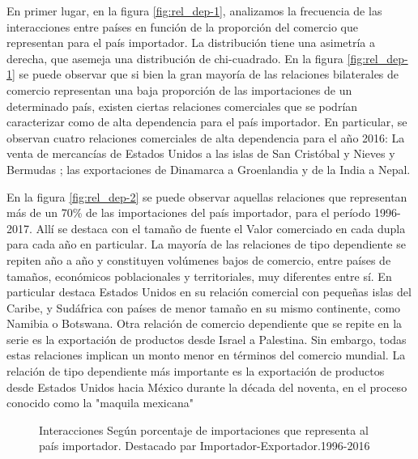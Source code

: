 \documentclass[class=article, crop=false]{standalone}
\begin{document}
En primer lugar, en la figura \ref{fig:rel_dep-1}, analizamos la frecuencia de las interacciones entre países en función de la proporción del comercio que representan para el país importador. La distribución tiene una asimetría a derecha, que asemeja una distribución de chi-cuadrado. En la figura \ref{fig:rel_dep-1} se puede observar que si bien la gran mayoría de las relaciones bilaterales de comercio representan una baja proporción de las importaciones de un determinado país, existen ciertas relaciones comerciales que se podrían caracterizar como de alta dependencia para el país importador. 
En particular, se observan cuatro relaciones comerciales de alta dependencia para el año 2016: La venta de mercancías de Estados Unidos a las islas de San Cristóbal y Nieves y Bermudas ; las exportaciones de Dinamarca a Groenlandia y de la India a Nepal. 

En la figura \ref{fig:rel_dep-2} se puede observar aquellas relaciones que representan más de un 70\% de las importaciones del país importador, para el período 1996-2017. Allí se destaca con el tamaño de fuente el Valor comerciado en cada dupla para cada año en particular. La mayoría de las relaciones de tipo dependiente se repiten año a año y constituyen volúmenes bajos de comercio, entre países de tamaños, económicos poblacionales y territoriales, muy diferentes entre sí. En particular destaca Estados Unidos en su relación comercial con pequeñas islas del Caribe, y Sudáfrica con países de menor tamaño en su mismo continente, como Namibia o Botswana. Otra relación de comercio dependiente que se repite en la serie es la exportación de productos desde Israel a Palestina. Sin embargo, todas estas relaciones implican un monto menor en términos del comercio mundial. La relación de tipo dependiente más importante es la exportación de productos desde Estados Unidos hacia México durante la década del noventa, en el proceso conocido como la "maquila mexicana" \citep{carrillo1998third}


\begin{figure}
	\centering
	\caption{Interacciones Según porcentaje de importaciones que representa al país importador. Destacado par Importador-Exportador.1996-2016}
	\label{fig:rel_dep}
\end{figure}
\end{document}
